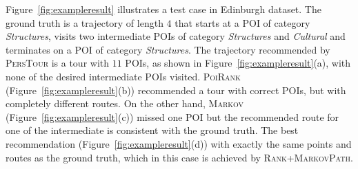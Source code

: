 Figure~\ref{fig:exampleresult} illustrates a test case in Edinburgh dataset.
The ground truth is a trajectory of length $4$ that starts at a POI of category \textit{Structures},
visits two intermediate POIs of category \textit{Structures} and \textit{Cultural} and
terminates on a POI of category \textit{Structures}.
The trajectory recommended by \textsc{PersTour} is a tour with $11$ POIs, as shown in Figure~\ref{fig:exampleresult}(a),
with none of the desired intermediate POIs visited.
\textsc{PoiRank} (Figure~\ref{fig:exampleresult}(b)) recommended a tour with correct POIs,
but with completely different routes.
On the other hand, \textsc{Markov} (Figure~\ref{fig:exampleresult}(c)) missed one POI but the recommended route for one of the intermediate is consistent with the ground truth.
The best recommendation%
(Figure~\ref{fig:exampleresult}(d)) 
with exactly the same points and routes as the ground truth,
which in this case is achieved by \textsc{Rank+MarkovPath}.




